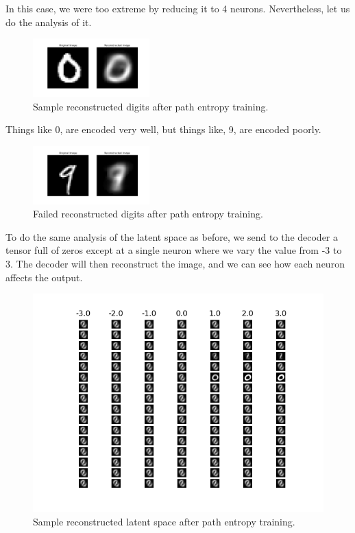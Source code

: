 \documentclass[12pt]{article}
\begin{document}
In this case, we were too extreme by reducing it to 4 neurons. Nevertheless, let us do the analysis of it.

\begin{figure}[ht]
    \centering
    \includegraphics[width=0.4\textwidth]{recon_example_path.png}
    \caption{Sample reconstructed digits after path entropy training.}
\end{figure}

Things like 0, are encoded very well, but things like, 9, are encoded poorly.

\begin{figure}[ht]
    \centering
    \includegraphics[width=0.4\textwidth]{recon_example_path_failed.png}
    \caption{Failed reconstructed digits after path entropy training.}
\end{figure}

To do the same analysis of the latent space as before, we send to the decoder a tensor full of zeros except at a single neuron where we vary the value from -3 to 3. The decoder will then reconstruct the image, and we can see how each neuron affects the output.

\begin{figure}[ht]
    \centering
    \includegraphics[width=1\textwidth]{latent_analyse_path.png}
    \caption{Sample reconstructed latent space after path entropy training.}
\end{figure}
\end{document}

